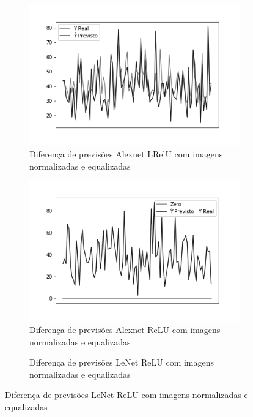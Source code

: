 \begin{figure}[hb!]
	\caption{Redes neurais biológicas.}
	\begin{subfigure}[hb]{0.5\linewidth}
		\caption{Diferença de previsões Alexnet LRelU com imagens normalizadas e equalizadas}
		\label{fig:histalexlrelunorm}
		\includegraphics[width=\linewidth]{img/graficos-fase2/fig-reta-dif-alexnet-lrelu-data-augmentation-22.png}
	\end{subfigure}%
	\begin{subfigure}[hb]{0.5\linewidth}
		\caption{Diferença de previsões Alexnet ReLU com imagens normalizadas e equalizadas}
		\label{fig:redeneuralbiologica}
		\includegraphics[width=\linewidth]{img/graficos-fase2/fig-reta-dif-alexnet-relu-data-augmentation-21.png}
	\end{subfigure}%
  \begin{subfigure}[hb]{0.5\linewidth}
    \caption{Diferença de previsões LeNet ReLU com imagens normalizadas e equalizadas}

\end{subfigure}
\end{figure}

